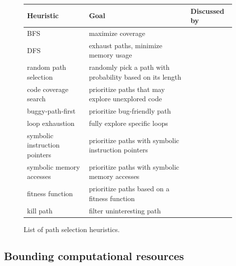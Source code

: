 \begin{figure}[t]
  \centering
  \begin{adjustbox}{width=1\columnwidth}
  \begin{small}
  \begin{tabular}{| l || l || l |}
    \hline      
    Heuristic & Goal & Discussed by \\ \hline\hline
    BFS & maximize coverage & \cite{CKC-TOCS12,PEX-TAP08} \\
    DFS & exhaust paths, minimize memory usage & \cite{EXE-CCS06,CKC-TOCS12,PEX-TAP08,DART-PLDI05} \\
    random path selection & randomly pick a path with probability based on its length & \cite{KLEE-OSDI08} \\
    code coverage search & prioritize paths that may explore unexplored code & \cite{EXE-CCS06,KLEE-OSDI08,MAYHEM-SP12,CKC-TOCS12,GV-ISSTA02} \\
    buggy-path-first & prioritize bug-friendly path  & \cite{AEG-NDSS11} \\
    loop exhaustion & fully explore specific loops  & \cite{AEG-NDSS11} \\
    symbolic instruction pointers & prioritize paths with symbolic instruction pointers & \cite{MAYHEM-SP12} \\
    symbolic memory accesses & prioritize paths with symbolic memory accesses & \cite{MAYHEM-SP12} \\ 
    fitness function & prioritize paths based on a fitness function & \cite{XTD-DSN09,CS-CACM13,XTD-DSN09} \\
    kill path & filter uninteresting path & \cite{CKC-TOCS12} \\
    
    \hline  
  \end{tabular}
  \end{small}
  \end{adjustbox}
  \caption{List of path selection heuristics.}
  \label{tab:heuristics}
\end{figure}


\subsection{Bounding computational resources}
\label{heuristics}

